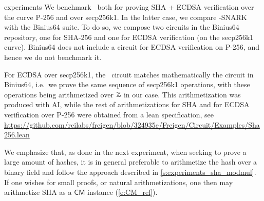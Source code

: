 \begin{lncsappendix}{experiments}
We benchmark \ftwoz\ both for proving SHA + ECDSA verification over the curve P-256 and over secp256k1. In the latter case, we compare \ftwoz-SNARK with the Binius64 \cite{binius64} suite. To do so, we compose two circuits in the Binius64 repository, one for SHA-256 and one for ECDSA   verification (on the secp256k1 curve). Binius64 does not include a circuit for ECDSA verification on P-256, and hence we do not benchmark it.


For ECDSA over secp256k1, the \ftwoz\ circuit matches mathematically the circuit in Binius64, i.e.\ we prove the same sequence of secp256k1 operations, with these operations being arithmetized over $\mathbb{Z}$ in our case. This arithmetization was produced with AI, while the rest of arithmetizations for SHA and for ECDSA verification over P-256  were obtained from a lean specification, see \url{https://github.com/reilabs/freigen/blob/324935e/Freigen/Circuit/Examples/Sha256.lean}




We emphasize that, as done in the next experiment, when seeking to prove a large amount of hashes, it is in  general preferable to arithmetize the hash over a binary field and follow the approach described in \cref{s:experiments_sha_modmul}. If one wishes for small proofs, or natural arithmetizations, one then may   arithmetize SHA as a $\mathsf{CM}$ instance (\cref{e:CM_rel}).




\end{lncsappendix}
